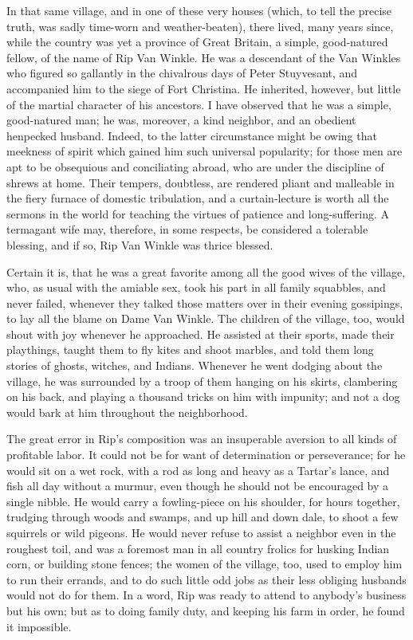 In that same village, and in one of these very houses (which, to tell the precise truth, was sadly time-worn and weather-beaten), there lived, many years since, while the country was yet a province of Great Britain, a simple, good-natured fellow, of the name of Rip Van Winkle. He was a descendant of the Van Winkles who figured so gallantly in the chivalrous days of Peter Stuyvesant, and accompanied him to the siege of Fort Christina. He inherited, however, but little of the martial character of his ancestors. I have observed that he was a simple, good-natured man; he was, moreover, a kind neighbor, and an obedient henpecked husband. Indeed, to the latter circumstance might be owing that meekness of spirit which gained him such universal popularity; for those men are apt to be obsequious and conciliating abroad, who are under the discipline of shrews at home. Their tempers, doubtless, are rendered pliant and malleable in the fiery furnace of domestic tribulation, and a curtain-lecture is worth all the sermons in the world for teaching the virtues of patience and long-suffering. A termagant wife may, therefore, in some respects, be considered a tolerable blessing, and if so, Rip Van Winkle was thrice blessed.

Certain it is, that he was a great favorite among all the good wives of the village, who, as usual with the amiable sex, took his part in all family squabbles, and never failed, whenever they talked those matters over in their evening gossipings, to lay all the blame on Dame Van Winkle. The children of the village, too, would shout with joy whenever he approached. He assisted at their sports, made their playthings, taught them to fly kites and shoot marbles, and told them long stories of ghosts, witches, and Indians. Whenever he went dodging about the village, he was surrounded by a troop of them hanging on his skirts, clambering on his back, and playing a thousand tricks on him with impunity; and not a dog would bark at him throughout the neighborhood.

The great error in Rip’s composition was an insuperable aversion to all kinds of profitable labor. It could not be for want of determination or perseverance; for he would sit on a wet rock, with a rod as long and heavy as a Tartar’s lance, and fish all day without a murmur, even though he should not be encouraged by a single nibble. He would carry a fowling-piece on his shoulder, for hours together, trudging through woods and swamps, and up hill and down dale, to shoot a few squirrels or wild pigeons. He would never refuse to assist a neighbor even in the roughest toil, and was a foremost man in all country frolics for husking Indian corn, or building stone fences; the women of the village, too, used to employ him to run their errands, and to do such little odd jobs as their less obliging husbands would not do for them. In a word, Rip was ready to attend to anybody’s business but his own; but as to doing family duty, and keeping his farm in order, he found it impossible.

